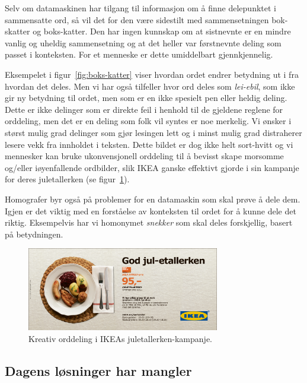 Selv om datamaskinen har tilgang til informasjon om å finne delepunktet i sammensatte ord, så vil det for den være sidestilt med sammensetningen bok-skatter og boks-katter. Den har ingen kunnskap om at sistnevnte er en mindre vanlig og uheldig sammensetning og at det heller var førstnevnte deling som passet i konteksten. For et menneske er dette umiddelbart gjennkjennelig.

Eksempelet i figur~\ref{fig:boks-katter} viser hvordan ordet endrer betydning ut i fra hvordan det deles. Men vi har også tilfeller hvor ord deles som \textit{lei-ebil}, som ikke gir ny betydning til ordet, men som er en ikke spesielt pen eller heldig deling. Dette er ikke delinger som er direkte feil i henhold til de gjeldene reglene for orddeling, men det er en deling som folk vil syntes er noe merkelig. Vi ønsker i størst mulig grad delinger som gjør lesingen lett og i minst mulig grad distraherer lesere vekk fra innholdet i teksten. Dette bildet er dog ikke helt sort-hvitt og vi mennesker kan bruke ukonvensjonell orddeling til å bevisst skape morsomme og/eller iøyenfallende ordbilder, slik IKEA ganske effektivt gjorde i sin kampanje for deres juletallerken (se figur~\ref{fig:ikea}).

Homografer byr også på problemer for en datamaskin som skal prøve å dele dem. Igjen er det viktig med en forståelse av konteksten til ordet for å kunne dele det riktig. Eksempelvis har vi homonymet \textit{snekker} som skal deles forskjellig, basert på betydningen.

\newline
{}

\begin{figure}[h]
\centering
\includegraphics[width=0.75\textwidth]{content/figures/jul-etallerken.pdf}
\caption[Kreativ orddeling]{Kreativ orddeling i IKEAs juletallerken-kampanje.}
\label{fig:ikea}
\end{figure}

\subsection{Dagens løsninger har mangler}

